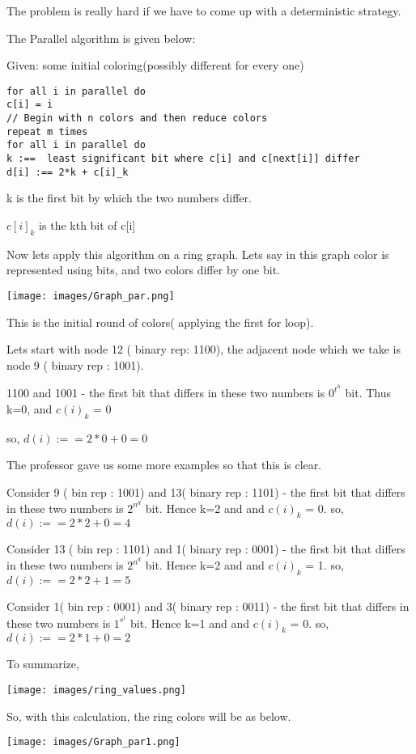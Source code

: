 \documentclass[twoside]{article}
\begin{document}
The problem is really hard if we have to come up with a deterministic strategy.

The Parallel algorithm is given below:

Given: some initial coloring(possibly different for every one)
\begin{lstlisting}
for all i in parallel do
c[i] = i
// Begin with n colors and then reduce colors
repeat m times
for all i in parallel do
k :==  least significant bit where c[i] and c[next[i]] differ
d[i] :== 2*k + c[i]_k
\end{lstlisting}
k is the first bit by which the two numbers differ.

$c[i]_k$ is the kth bit of c[i]

Now lets apply this algorithm on a ring graph. Lets say in this graph color is represented using bits, and two colors differ by one bit.

\texttt{[image: images/Graph\_par.png]}


This is the initial round of colors( applying the first for loop).

Lets start with node 12 ( binary rep: 1100), the adjacent node which we take is node 9 ( binary rep : 1001).

1100 and 1001 - the first bit that differs in these two numbers is $0^t^h$ bit. Thus k=0, and $c(i)_k$ = 0

so, $d(i) :== 2*0 +0 = 0$

The professor gave us some more examples so that this is clear.

    
Consider 9 ( bin rep : 1001) and 13( binary rep : 1101) - the first bit that differs in these two numbers is $2^n^d$ bit. Hence k=2 and and $c(i)_k$ = 0.
so, $d(i) :== 2*2 +0 = 4$


Consider 13 ( bin rep : 1101) and 1( binary rep : 0001) - the first bit that differs in these two numbers is $2^n^d$ bit. Hence k=2 and and $c(i)_k$ = 1.
so, $d(i) :== 2*2 +1 = 5$


Consider 1( bin rep : 0001) and 3( binary rep : 0011) - the first bit that differs in these two numbers is $1^s^t$ bit. Hence k=1 and and $c(i)_k$ = 0.
so, $d(i) :== 2*1 +0 = 2$



To summarize, 

\texttt{[image: images/ring\_values.png]}

So, with this calculation, the ring colors will be as below.

\texttt{[image: images/Graph\_par1.png]}
\end{document}
